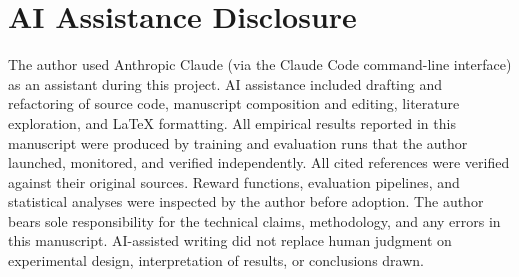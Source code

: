 \documentclass[11pt]{article}
\begin{document}
\section*{AI Assistance Disclosure}
\label{sec:ai_disclosure}
The author used Anthropic Claude (via the Claude Code command-line
interface) as an assistant during this project. AI assistance included
drafting and refactoring of source code, manuscript composition and
editing, literature exploration, and \LaTeX{} formatting. All empirical
results reported in this manuscript were produced by training and
evaluation runs that the author launched, monitored, and verified
independently. All cited references were verified against their
original sources. Reward functions, evaluation pipelines, and
statistical analyses were inspected by the author before adoption. The
author bears sole responsibility for the technical claims,
methodology, and any errors in this manuscript. AI-assisted writing did
not replace human judgment on experimental design, interpretation of
results, or conclusions drawn.



\appendix

\end{document}
